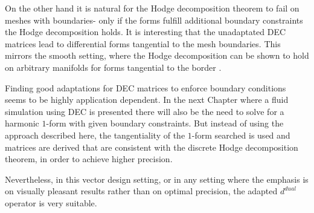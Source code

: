 On the other hand it is natural for the Hodge decomposition theorem to fail on meshes with boundaries- only if the forms fulfill additional boundary constraints the Hodge decomposition holds. It is interesting that the unadaptated DEC matrices lead to differential forms tangential to the mesh boundaries. This mirrors the smooth setting, where the Hodge decomposition can be shown to hold on arbitrary manifolds for forms tangential to the border \cite{FRANKEL11}. 

Finding good adaptations for DEC matrices to enforce boundary conditions seems to be highly application dependent.
In the next Chapter where a fluid simulation using DEC is presented there will also be the need to solve for a harmonic $1$-form with given boundary constraints. But instead of using the approach described here, the tangentiality of the $1$-form searched is used and matrices are derived that are consistent with the discrete Hodge decomposition theorem, in order to achieve higher precision.

Nevertheless, in this vector design setting, or in any setting where the emphasis is on visually pleasant results rather than on optimal precision, the adapted $d^{dual}$ operator is very suitable.